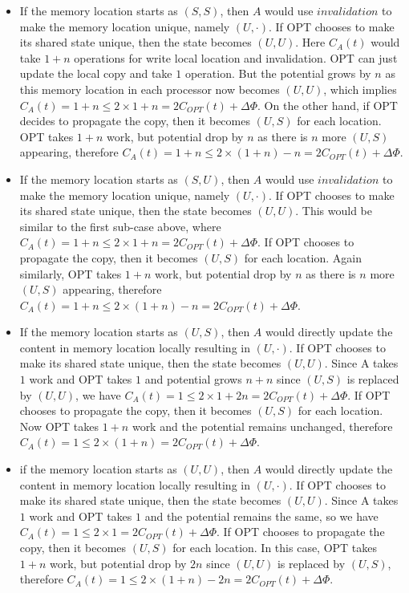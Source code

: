 \documentclass[12pt]{article}
\begin{document}
\begin{itemize}
	\item If the memory location starts as $(S, S)$, then $A$ would use $invalidation$ to make the memory location unique, namely $(U, \cdot)$. If OPT chooses to make its shared state unique, then the state becomes $(U, U)$. Here $C_A(t)$ would take $1 + n$ operations for write local location and invalidation. OPT can just update the local copy and take $1$ operation. But the potential grows by $n$ as this memory location in each processor now becomes $(U, U)$, which implies $C_A(t) = 1 + n \leq 2\times 1 + n = 2C_{OPT}(t) + \Delta \Phi$. On the other hand, if OPT decides to propagate the copy, then it becomes $(U, S)$ for each location. OPT takes $1+n$ work, but potential drop by $n$ as there is $n$ more $(U, S)$ appearing, therefore $C_A(t) = 1 + n \leq 2\times (1 + n) - n = 2C_{OPT}(t) + \Delta \Phi$.
	
	\item If the memory location starts as $(S, U)$, then $A$ would use $invalidation$ to make the memory location unique, namely $(U, \cdot)$. If OPT chooses to make its shared state unique, then the state becomes $(U, U)$. This would be similar to the first sub-case above, where $C_A(t) = 1 + n \leq 2\times 1 + n = 2C_{OPT}(t) + \Delta \Phi$. If OPT chooses to propagate the copy, then it becomes $(U, S)$ for each location. Again similarly, OPT takes $1+n$ work, but potential drop by $n$ as there is $n$ more $(U, S)$ appearing, therefore $C_A(t) = 1 + n \leq 2\times (1 + n) - n = 2C_{OPT}(t) + \Delta \Phi$.
	
	\item If the memory location starts as $(U, S)$, then $A$ would directly update the content in memory location locally resulting in $(U, \cdot)$. If OPT chooses to make its shared state unique, then the state becomes $(U, U)$. Since A takes $1$ work and OPT takes $1$ and potential grows $n + n$ since $(U, S)$ is replaced by $(U,U)$, we have $C_A(t) = 1 \leq 2\times 1 + 2n = 2C_{OPT}(t) + \Delta \Phi$. If OPT chooses to propagate the copy, then it becomes $(U, S)$ for each location. Now OPT takes $1+n$ work and the potential remains unchanged, therefore $C_A(t) = 1 \leq 2\times (1 + n) = 2C_{OPT}(t) + \Delta \Phi$.
	
	\item if the memory location starts as $(U, U)$, then $A$ would directly update the content in memory location locally resulting in $(U, \cdot)$. If OPT chooses to make its shared state unique, then the state becomes $(U, U)$. Since A takes $1$ work and OPT takes $1$ and the potential remains the same, so we have $C_A(t) = 1 \leq 2\times 1 = 2C_{OPT}(t) + \Delta \Phi$.  If OPT chooses to propagate the copy, then it becomes $(U, S)$ for each location. In this case, OPT takes $1+n$ work, but potential drop by $2n$ since $(U, U)$ is replaced by $(U,S)$, therefore $C_A(t) = 1 \leq 2\times (1 + n) - 2n = 2C_{OPT}(t) + \Delta \Phi$.
\end{itemize}
\end{document}
